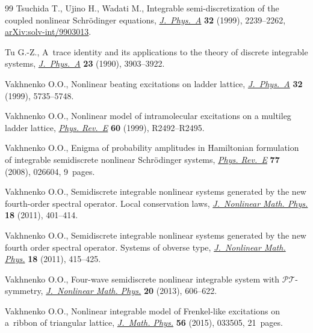 \documentclass[10pt,a4paper]{amsart}
\numberwithin{equation}{section}
\begin{document}
\begin{thebibliography}{99}
Tsuchida T., Ujino H., Wadati M., Integrable semi-discretization of the coupled
 nonlinear {S}chr\"odinger equations,
 \href{https://doi.org/10.1088/0305-4470/32/11/016}{\textit{J.~Phys.~A}}
 \textbf{32} (1999), 2239--2262,
 \href{http://arxiv.org/abs/solv-int/9903013}{arXiv:solv-int/9903013}.

Tu G.-Z., A~trace identity and its applications to the theory of discrete
 integrable systems,
 \href{https://doi.org/10.1088/0305-4470/23/17/020}{\textit{J.~Phys.~A}}
 \textbf{23} (1990), 3903--3922.

Vakhnenko O.O., Nonlinear beating excitations on ladder lattice,
 \href{https://doi.org/10.1088/0305-4470/32/30/315}{\textit{J.~Phys.~A}}
 \textbf{32} (1999), 5735--5748.

Vakhnenko O.O., Nonlinear model of intramolecular excitations on a multileg
 ladder lattice,
 \href{https://doi.org/10.1103/PhysRevE.60.R2492}{\textit{Phys. Rev.~E}}
 \textbf{60} (1999), R2492--R2495.

Vakhnenko O.O., Enigma of probability amplitudes in {H}amiltonian formulation
 of integrable semidiscrete nonlinear {S}chr\"odinger systems,
 \href{https://doi.org/10.1103/PhysRevE.77.026604}{\textit{Phys. Rev.~E}}
 \textbf{77} (2008), 026604, 9~pages.

Vakhnenko O.O., Semidiscrete integrable nonlinear systems generated by the new
 fourth-order spectral operator. {L}ocal conservation laws,
 \href{https://doi.org/10.1142/S1402925111001672}{\textit{J.~Nonlinear Math.
 Phys.}} \textbf{18} (2011), 401--414.

Vakhnenko O.O., Semidiscrete integrable nonlinear systems generated by the new
 fourth order spectral operator. {S}ystems of obverse type,
 \href{https://doi.org/10.1142/S1402925111001684}{\textit{J.~Nonlinear Math.
 Phys.}} \textbf{18} (2011), 415--425.

Vakhnenko O.O., Four-wave semidiscrete nonlinear integrable system with
 {$\mathcal{PT}$}-symmetry,
 \href{https://doi.org/10.1080/14029251.2013.865827}{\textit{J.~Nonlinear
 Math. Phys.}} \textbf{20} (2013), 606--622.

Vakhnenko O.O., Nonlinear integrable model of {F}renkel-like excitations on
 a~ribbon of triangular lattice,
 \href{https://doi.org/10.1063/1.4914510}{\textit{J.~Math. Phys.}} \textbf{56}
 (2015), 033505, 21~pages.


\end{thebibliography}
\end{document}
